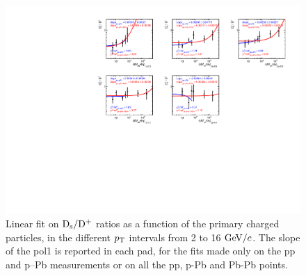 \begin{figure}[h!]
    \begin{center}
          \includegraphics[width=1.1\textwidth]{./FigCap6/Fit_DsOverDplusVsMult_pp7TeV_pPb5TeV_PbPb5TeV.pdf}
    \end{center}
    \caption{Linear fit on ${\rm D_s}/{\rm D^+}$ ratios as a function of the primary charged particles, in the different $p_{\rm T}$ intervals from 2 to 16 $\mathrm{GeV}/c$. The slope of the pol1 is reported in each pad, for the fits made only on the pp and p--Pb measurements or on
    all the pp, p-Pb and Pb-Pb points.}
    \label{fig:FitRatios}
\end{figure}





